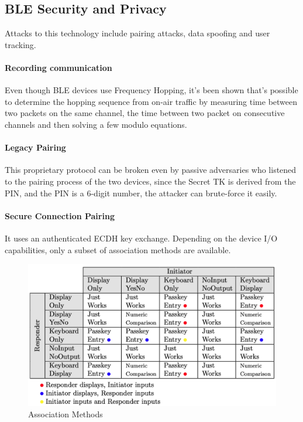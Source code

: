\subsection{BLE Security and Privacy}
Attacks to this technology include pairing attacks, data spoofing and user tracking.
\paragraph{Recording communication}
Even though BLE devices use Frequency Hopping, it's been shown that's possible to determine the hopping sequence from on-air traffic by measuring time between two packets on the same channel, the time between two packet on consecutive channels and then solving a few modulo equations. 

\paragraph{Legacy Pairing}
This proprietary protocol can be broken even by passive adversaries who listened to the pairing process of the two devices, since the Secret TK is derived from the PIN, and the PIN is a 6-digit number, the attacker can brute-force it easily.

\paragraph{Secure Connection Pairing}
It uses an authenticated ECDH key exchange. Depending on the device I/O capabilities, only a subset of association methods are available.

\begin{figure}[h]
	\centering
	\includegraphics[scale=0.45]{images/11-assoc-methods.png}
	\caption{Association Methods}
	\label{fig:assoc-methons}
\end{figure}

